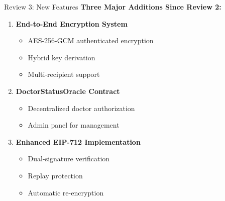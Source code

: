 \documentclass[10pt]{beamer}
\begin{document}
\begin{frame}{Review 3: New Features}
\textbf{Three Major Additions Since Review 2:}

\begin{enumerate}
\item \textbf{End-to-End Encryption System}
    \begin{itemize}
    \item AES-256-GCM authenticated encryption
    \item Hybrid key derivation
    \item Multi-recipient support
    \end{itemize}

\item \textbf{DoctorStatusOracle Contract}
    \begin{itemize}
    \item Decentralized doctor authorization
    \item Admin panel for management
    \end{itemize}

\item \textbf{Enhanced EIP-712 Implementation}
    \begin{itemize}
    \item Dual-signature verification
    \item Replay protection
    \item Automatic re-encryption
    \end{itemize}
\end{enumerate}
\end{frame}
\end{document}
